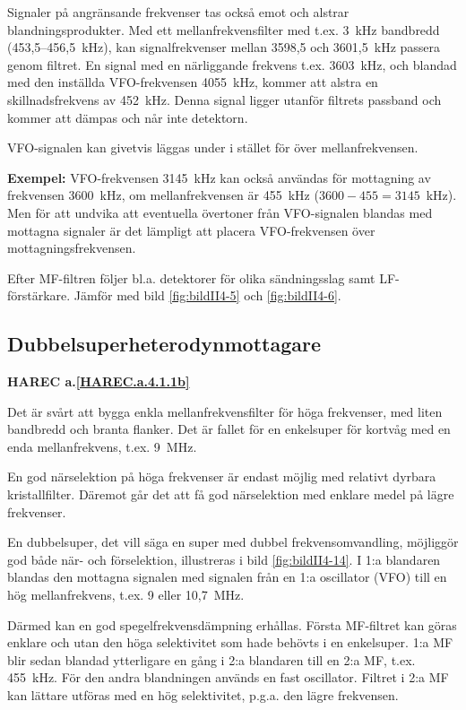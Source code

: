 Signaler på angränsande frekvenser tas också emot och alstrar
blandningsprodukter.
Med ett mellanfrekvensfilter med t.ex. 3~kHz bandbredd (453,5--456,5~kHz),
kan signalfrekvenser mellan 3598,5 och 3601,5~kHz passera genom filtret.
En signal med en närliggande frekvens t.ex. 3603~kHz, och blandad med den
inställda VFO-frekvensen 4055~kHz, kommer att alstra en skillnadsfrekvens av
452~kHz.
Denna signal ligger utanför filtrets passband och kommer att dämpas och når
inte detektorn.

VFO-signalen kan givetvis läggas under i stället för över mellanfrekvensen.

\textbf{Exempel:}
VFO-frekvensen 3145~kHz kan också användas för mottagning av frekvensen
3600~kHz, om mellanfrekvensen är 455~kHz (\(3600 - 455 = 3145\)~kHz).
Men för att undvika att eventuella övertoner från VFO-signalen blandas med
mottagna signaler är det lämpligt att placera VFO-frekvensen över
mottagningsfrekvensen.

Efter MF-filtren följer bl.a. detektorer för olika sändningsslag samt
LF-förstärkare.
Jämför med bild \ref{fig:bildII4-5} och \ref{fig:bildII4-6}.

\subsection{Dubbelsuperheterodynmottagare}
\textbf{HAREC a.\ref{HAREC.a.4.1.1b}\label{myHAREC.a.4.1.1b}}

Det är svårt att bygga enkla mellanfrekvensfilter för höga frekvenser,
med liten bandbredd och branta flanker. Det är fallet för en
enkelsuper för kortvåg med en enda mellanfrekvens, t.ex. 9~MHz.

En god närselektion på höga frekvenser är endast möjlig med relativt
dyrbara kristallfilter.
Däremot går det att få god närselektion med enklare medel på lägre frekvenser.

En dubbelsuper, det vill säga en super med dubbel frekvensomvandling,
möjliggör god både när- och förselektion, illustreras i bild
\ref{fig:bildII4-14}.
I 1:a blandaren blandas den mottagna signalen med signalen från en
1:a oscillator (VFO) till en hög mellanfrekvens, t.ex. 9 eller 10,7~MHz.

Därmed kan en god spegelfrekvensdämpning erhållas.
Första MF-filtret kan göras enklare och utan den höga selektivitet som hade
behövts i en enkelsuper.
1:a MF blir sedan blandad ytterligare en gång i 2:a blandaren till en 2:a MF,
t.ex. 455~kHz.
För den andra blandningen används en fast oscillator.
Filtret i 2:a MF kan lättare utföras med en hög selektivitet, p.g.a. den
lägre frekvensen.

